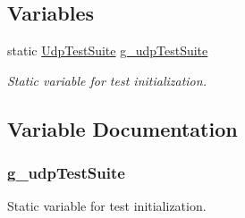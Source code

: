 \subsection*{Variables}
\begin{DoxyCompactItemize}
\item 
static \hyperlink{classUdpTestSuite}{Udp\+Test\+Suite} \hyperlink{udp-test_8cc_a052be7c7d4e4c837c07ed973278960a1}{g\+\_\+udp\+Test\+Suite}
\begin{DoxyCompactList}\small\item\em Static variable for test initialization. \end{DoxyCompactList}\end{DoxyCompactItemize}


\subsection{Variable Documentation}
\subsubsection[{\texorpdfstring{g\+\_\+udp\+Test\+Suite}{g_udpTestSuite}}]{ g\+\_\+udp\+Test\+Suite\hspace{0.3cm}{\ttfamily [static]}}\hypertarget{udp-test_8cc_a052be7c7d4e4c837c07ed973278960a1}{}\label{udp-test_8cc_a052be7c7d4e4c837c07ed973278960a1}


Static variable for test initialization. 

